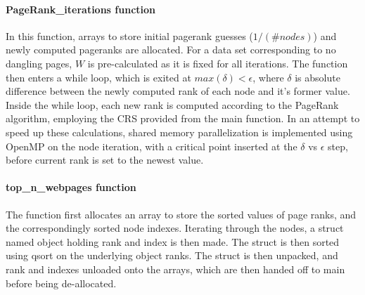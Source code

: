 \documentclass[%
oneside,                 %
final,                   %
10pt]{article}
\begin{document}
\paragraph{PageRank\_iterations function}
In this function, arrays to store initial pagerank guesses ($1/(\#nodes)$) and newly computed pageranks are allocated. For a data set corresponding to no dangling pages, $W$ is pre-calculated as it is fixed for all iterations. The function then enters a while loop, which is exited at $max(\delta)<\epsilon$, where $\delta$ is absolute difference between the newly computed rank of each node and it's former value. Inside the while loop, each new rank is computed according to the PageRank algorithm, employing the CRS provided from the main function. In an attempt to speed up these calculations, shared memory parallelization is implemented using OpenMP on the node iteration, with a critical point inserted at the $\delta$ vs $\epsilon$ step, before current rank is set to the newest value.

\paragraph{top\_n\_webpages function}
The function first allocates an array to store the sorted values of page ranks, and the correspondingly sorted node indexes. Iterating through the nodes, a struct named object holding rank and index is then made. The struct is then sorted using qsort on the underlying object ranks. The struct is then unpacked, and rank and indexes unloaded onto the arrays, which are then handed off to main before being de-allocated. 
\end{document}
